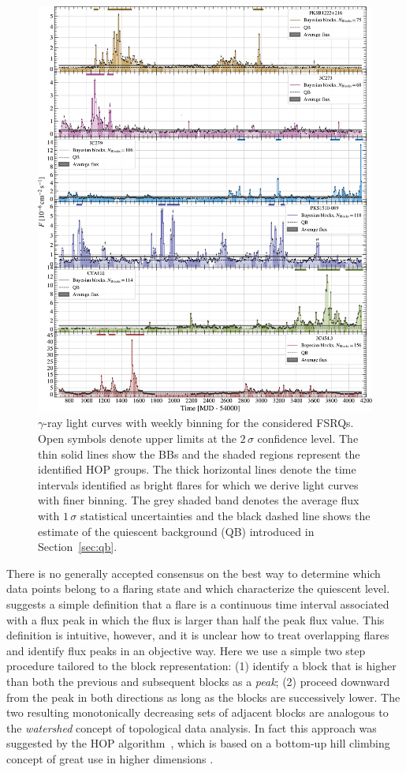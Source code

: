 \documentclass[twocolumn,linenumbers]{aastex62}
\newcommand{\gray}{$\gamma$-ray\xspace}
\begin{document}
\begin{figure}
    \centering
    \includegraphics[width = .9\linewidth]{figures/lc_weekly_tsmin9.pdf}
    \caption{\gray light curves with weekly binning for the considered FSRQs. Open symbols denote upper limits at the $2\,\sigma$ confidence level. The thin solid lines show the BBs and the shaded regions represent the identified HOP groups. The thick horizontal lines denote the time intervals identified as bright flares for which we derive light curves with finer binning.
    The grey shaded band denotes the average flux with $1\,\sigma$ statistical uncertainties and the black dashed line shows the estimate of the quiescent background (QB) introduced in Section~\ref{sec:qb}.}
    \label{fig:weekly}
\end{figure}

There is no generally accepted consensus on the best way to determine which data points belong to a flaring state and which characterize the quiescent level. \citet{2013MNRAS.430.1324N} suggests a simple definition that a flare is a continuous time interval associated with a flux peak in which the flux is larger than half the peak flux value. 
This definition is intuitive, however, and it is unclear how to treat overlapping flares and identify flux peaks in an objective way. 
Here we use a simple two step procedure tailored to the block representation: (1) identify a block that is higher than both the previous and subsequent blocks as a \textit{peak}; (2) proceed downward from the peak in both directions as long as the blocks are successively lower.
The two resulting monotonically decreasing sets of adjacent blocks are analogous to the \textit{watershed} concept of topological data analysis.
In fact this approach was suggested by the 
HOP algorithm~\citep{1998ApJ...498..137E}, which is based on a bottom-up hill climbing concept of great use in higher dimensions \citep[e.g.,][]{2011ApJ...727...48W}.
\end{document}
